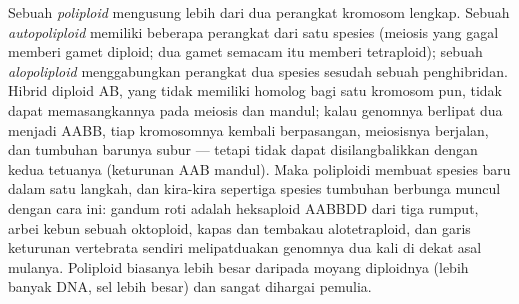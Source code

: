 \begin{definition}[Poliploidi]\label{def:b2:genome-diversification:polyploidy}
Sebuah \emph{poliploid} mengusung lebih dari dua perangkat kromosom
lengkap. Sebuah \emph{autopoliploid} memiliki beberapa perangkat dari
satu spesies (meiosis yang gagal memberi gamet diploid; dua gamet
semacam itu memberi tetraploid); sebuah \emph{alopoliploid}
menggabungkan perangkat dua spesies sesudah sebuah penghibridan.
Hibrid diploid AB, yang tidak memiliki homolog bagi satu kromosom pun,
tidak dapat memasangkannya pada meiosis dan mandul; kalau genomnya
berlipat dua menjadi AABB, tiap kromosomnya kembali berpasangan,
meiosisnya berjalan, dan tumbuhan barunya subur --- tetapi tidak dapat
disilangbalikkan dengan kedua tetuanya (keturunan AAB mandul). Maka
poliploidi membuat spesies baru dalam satu langkah, dan kira-kira
sepertiga spesies tumbuhan berbunga muncul dengan cara ini: gandum roti
adalah heksaploid AABBDD dari tiga rumput, arbei kebun sebuah
oktoploid, kapas dan tembakau alotetraploid, dan garis keturunan
vertebrata sendiri melipatduakan genomnya dua kali di dekat asal
mulanya. Poliploid biasanya lebih besar daripada moyang diploidnya
(lebih banyak DNA, sel lebih besar) dan sangat dihargai pemulia.
\end{definition}

